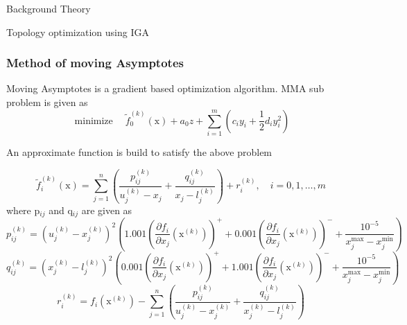 \documentclass[a4paper,12pt,times]{article}
\begin{document}
\begin{section}{Background Theory}
\begin{subsection}{Topology optimization using IGA}
\subsubsection{Method of moving Asymptotes }

Moving Asymptotes is a gradient based optimization algorithm.
MMA sub problem is given as \cite{https://doi.org/10.1002/nme.1620240207}
\begin{equation}
\operatorname{minimize} \quad \tilde{f}_{0}^{(k)}(\mathrm{x})+a_{0} z+\sum_{i=1}^{m}\left(c_{i} y_{i}+\frac{1}{2} d_{i} y_{i}^{2}\right)
\end{equation}


An approximate function is build to satisfy the above problem

\begin{equation}
\tilde{f}_{i}^{(k)}(\mathrm{x})=\sum_{j=1}^{n}\left(\frac{p_{i j}^{(k)}}{u_{j}^{(k)}-x_{j}}+\frac{q_{i j}^{(k)}}{x_{j}-l_{j}^{(k)}}\right)+r_{i}^{(k)}, \quad i=0,1, \ldots, m
\end{equation}
where p$_{i j}$ and q$_{i j}$ are given as
\begin{equation}
p_{i j}^{(k)}=\left(u_{j}^{(k)}-x_{j}^{(k)}\right)^{2}\left(1.001\left(\frac{\partial f_{i}}{\partial x_{j}}\left(\mathrm{x}^{(k)}\right)\right)^{+}+0.001\left(\frac{\partial f_{i}}{\partial x_{j}}\left(\mathrm{x}^{(k)}\right)\right)^{-}+\frac{10^{-5}}{x_{j}^{\max }-x_{j}^{\min }}\right)
\end{equation}
\begin{equation}
q_{i j}^{(k)}=\left(x_{j}^{(k)}-l_{j}^{(k)}\right)^{2}\left(0.001\left(\frac{\partial f_{i}}{\partial x_{j}}\left(\mathrm{x}^{(k)}\right)\right)^{+}+1.001\left(\frac{\partial f_{i}}{\partial x_{j}}\left(\mathrm{x}^{(k)}\right)\right)^{-}+\frac{10^{-5}}{x_{j}^{\max }-x_{j}^{\min }}\right)
\end{equation}
\begin{equation}
r_{i}^{(k)}=f_{i}\left(\mathrm{x}^{(k)}\right)-\sum_{j=1}^{n}\left(\frac{p_{i j}^{(k)}}{u_{j}^{(k)}-x_{j}^{(k)}}+\frac{q_{i j}^{(k)}}{x_{j}^{(k)}-l_{j}^{(k)}}\right)
\end{equation}


\end{subsection}
\end{section}
\end{document}
